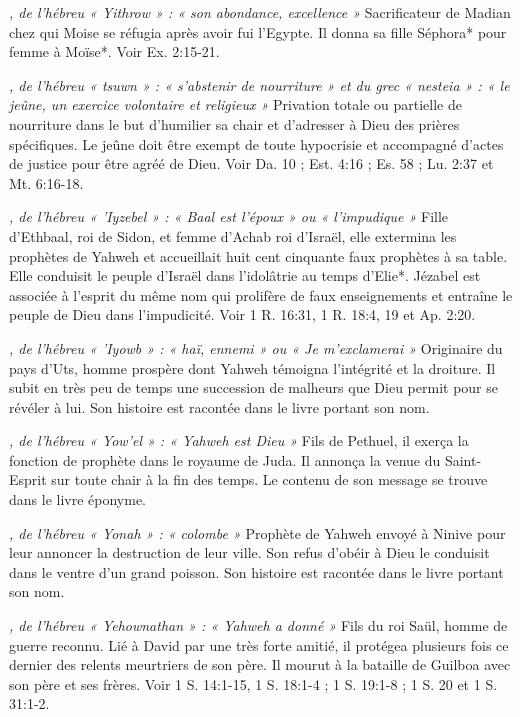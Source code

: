 \begin{multicols}{2}
{\textit{, de l'hébreu « Yithrow » : « son abondance, excellence »}\newline
Sacrificateur de Madian chez qui Moise se réfugia après avoir fui l'Egypte. Il donna sa fille Séphora* pour femme à Moïse*. Voir Ex. 2:15-21.

\textit{, de l'hébreu « tsuwn » : « s'abstenir de nourriture » et du grec « nesteia » : « le jeûne, un exercice volontaire et religieux »}\newline
Privation totale ou partielle de nourriture dans le but d'humilier sa chair et d'adresser à Dieu des prières spécifiques. Le jeûne doit être exempt de toute hypocrisie et accompagné d'actes de justice pour être agréé de Dieu. Voir Da. 10 ; Est. 4:16 ; Es. 58 ; Lu. 2:37 et Mt. 6:16-18.

\textit{, de l'hébreu « 'Iyzebel » : « Baal est l'époux » ou « l'impudique »}\newline
Fille d'Ethbaal, roi de Sidon, et femme d'Achab roi d'Israël, elle extermina les prophètes de Yahweh et accueillait huit cent cinquante faux prophètes à sa table. Elle conduisit le peuple d'Israël dans l'idolâtrie au temps d'Elie*. Jézabel est associée à l'esprit du même nom qui prolifère de faux enseignements et entraîne le peuple de Dieu dans l'impudicité. Voir 1 R. 16:31, 1 R. 18:4, 19 et Ap. 2:20.

\textit{, de l'hébreu « 'Iyowb » : « haï, ennemi » ou « Je m'exclamerai »}\newline
Originaire du pays d'Uts, homme prospère dont Yahweh témoigna l'intégrité et la droiture. Il subit en très peu de temps une succession de malheurs que Dieu permit pour se révéler à lui. Son histoire est racontée dans le livre portant son nom.

\textit{, de l'hébreu « Yow'el » : « Yahweh est Dieu »}\newline
Fils de Pethuel, il exerça la fonction de prophète dans le royaume de Juda. Il annonça la venue du Saint-Esprit sur toute chair à la fin des temps. Le contenu de son message se trouve dans le livre éponyme.

\textit{, de l'hébreu « Yonah » : « colombe »}\newline
Prophète de Yahweh envoyé à Ninive pour leur annoncer la destruction de leur ville. Son refus d'obéir à Dieu le conduisit dans le ventre d'un grand poisson. Son histoire est racontée dans le livre portant son nom.

\textit{, de l'hébreu « Yehownathan » : « Yahweh a donné »}\newline
Fils du roi Saül, homme de guerre reconnu. Lié à David par une très forte amitié, il protégea plusieurs fois ce dernier des relents meurtriers de son père. Il mourut à la bataille de Guilboa avec son père et ses frères. Voir 1 S. 14:1-15, 1 S. 18:1-4 ; 1 S. 19:1-8 ; 1 S. 20 et 1 S. 31:1-2.

}
\end{multicols}
